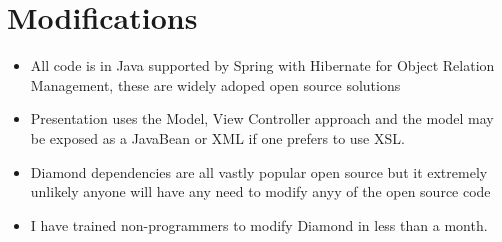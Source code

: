 \documentclass[letterpaper,10pt,english]{sphinxmanual}
\begin{document}
\chapter{Modifications}
\label{BusinessProcessReengineering:modifications}\begin{itemize}
\item {} 
All code is in Java supported by Spring with Hibernate for Object
Relation Management, these are widely adoped open source solutions

\item {} 
Presentation uses the Model, View Controller approach and the model
may be exposed as a JavaBean or XML if one prefers to use XSL.

\item {} 
Diamond dependencies are all vastly popular open source but it
extremely unlikely anyone will have any need to modify anyy of the
open source code

\item {} 
I have trained non-programmers to modify Diamond in less than a
month.

\end{itemize}
\end{document}
